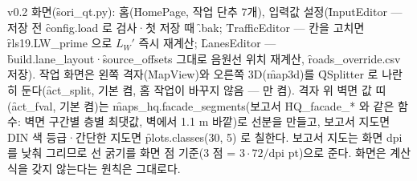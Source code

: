 \documentclass[10.5pt,a4paper]{article}
\begin{document}
v0.2 화면(\f{sori\_qt.py}): 홈(\f{HomePage}, 작업 단추 7개), 입력값 설정(\f{InputEditor} — 저장 전 \f{config.load} 로 검사·첫 저장 때 \f{.bak}; \f{TrafficEditor} — 칸을 고치면 \f{rls19.LW\_prime} 으로 $L_W'$ 즉시 재계산; \f{LanesEditor} — \f{build.lane\_layout}·\f{source\_offsets} 그대로 음원선 위치 재계산, \f{roads\_override.csv} 저장). 작업 화면은 왼쪽 격자(\f{MapView})와 오른쪽 3D(\f{map3d})를 \f{QSplitter} 로 나란히 둔다(\f{act\_split}, 기본 켬, 홈 작업이 바꾸지 않음 — 만 켬). 격자 위 벽면 값 띠(\f{act\_fval}, 기본 켬)는 \f{maps\_hq.facade\_segments}(보고서 \f{HQ\_facade\_*} 와 같은 함수: 벽면 구간별 층별 최댓값, 벽에서 1.1 m 바깥)로 선분을 만들고, 보고서 지도면 DIN 색 등급·간단한 지도면 \f{plots.classes(30, 5)} 로 칠한다. 보고서 지도는 화면 dpi 를 낮춰 그리므로 선 굵기를 화면 점 기준(3 점 = $3\cdot72/\mathrm{dpi}$ pt)으로 준다. 화면은 계산식을 갖지 않는다는 원칙은 그대로다.

\end{document}
